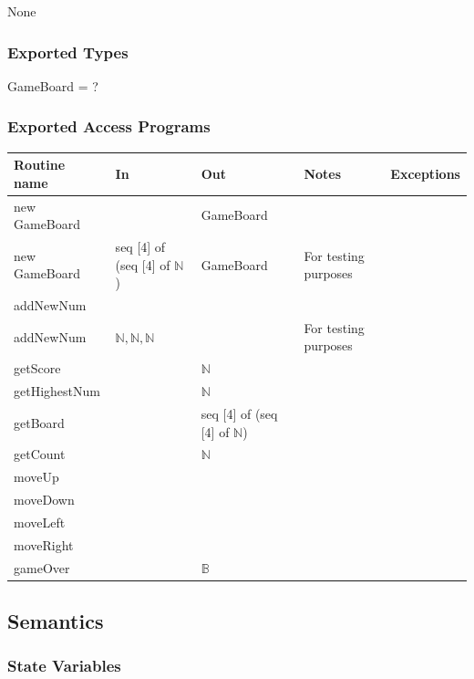 \documentclass[12pt]{article}
\begin{document}
None

\subsubsection* {Exported Types}

GameBoard = ?

\medskip

\subsubsection* {Exported Access Programs}

\begin{tabular}{| l | l | l | l | l |}
    \hline
    \textbf{Routine name} & \textbf{In} & \textbf{Out} & \textbf{Notes} &\textbf{Exceptions}\\
    \hline
    new GameBoard & & GameBoard &  &\\
    \hline
    new GameBoard & seq [4] of (seq [4] of $\mathbb{N}$) & GameBoard & For
    testing purposes &\\
    \hline
    addNewNum & & & &\\
    \hline
    addNewNum & $\mathbb{N}, \mathbb{N}, \mathbb{N}$ & & For
    testing purposes &\\
    \hline
    getScore &  & $\mathbb{N}$ & &\\
    \hline
    getHighestNum &  & $\mathbb{N}$& &\\
    \hline
    getBoard &  &seq [4] of (seq [4] of $\mathbb{N}$) & &\\
    \hline
    getCount &  &$\mathbb{N}$ & &\\
    \hline
    moveUp &  & & &\\
    \hline
    moveDown &  & & &\\
    \hline
    moveLeft &  & & &\\
    \hline
    moveRight &  & & &\\
    \hline
    gameOver & & $\mathbb{B}$ & &\\
    \hline
    \end{tabular}

\subsection* {Semantics}

\subsubsection* {State Variables}
\end{document}
